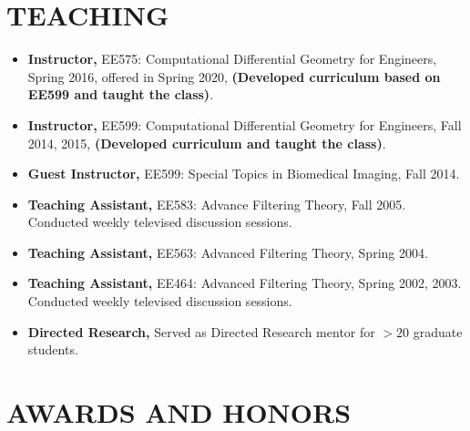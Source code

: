 \documentclass[overlapped,line,letterpaper]{res}
\begin{document}
\begin{resume}
\section{\bf TEACHING}
\begin{itemize}
\item \textbf{Instructor,} EE575: Computational Differential Geometry for Engineers, Spring 2016, offered in Spring 2020, \textbf{(Developed curriculum based on EE599 and taught the class)}. 
\item \textbf{Instructor,} EE599: Computational Differential Geometry for Engineers, Fall 2014, 2015, \textbf{(Developed curriculum and taught the class)}. 
\item \textbf{Guest Instructor,} EE599: Special Topics in Biomedical Imaging, Fall 2014. 
\item \textbf{Teaching Assistant,} EE583: Advance Filtering Theory, Fall 2005. Conducted weekly televised discussion sessions. 
\item \textbf{Teaching Assistant,} EE563: Advanced Filtering Theory, Spring 2004. 
\item \textbf{Teaching Assistant,} EE464: Advanced Filtering Theory, Spring 2002, 2003. Conducted weekly televised discussion sessions. 
\item \textbf{Directed Research,} Served as Directed Research mentor for $>20$ graduate students.

\end{itemize}

\section{\bf AWARDS AND HONORS}


\end{resume}
\end{document}
